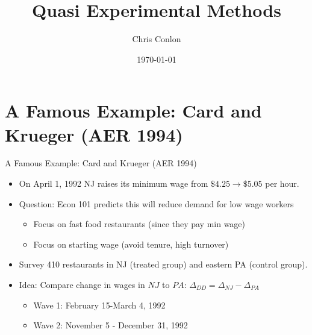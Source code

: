 


\title{Quasi Experimental Methods}
\author{Chris Conlon}
\date{\today}

\frame{\titlepage}

\section{A Famous Example: Card and Krueger (AER 1994)}

\begin{frame}{A Famous Example: Card and Krueger (AER 1994)}
\begin{itemize}
\item On April 1, 1992 NJ raises its minimum wage from $\$4.25\rightarrow \$5.05$ per hour.
\item Question: Econ 101 predicts this will \alert{reduce demand for low wage workers}
\begin{itemize}
\item Focus on fast food restaurants (since they pay min wage)
\item Focus on starting wage (avoid tenure, high turnover)
\end{itemize}
\item Survey 410 restaurants in NJ (treated group) and eastern PA (control group).
\item Idea: Compare \alert{change} in wages in $NJ$ to $PA$:  $\Delta_{DD} = \Delta_{NJ}- \Delta_{PA}$
\begin{itemize}
\item Wave 1: February 15-March 4, 1992
\item Wave 2: November 5 - December 31, 1992
\end{itemize}
\end{itemize}
\end{frame}

